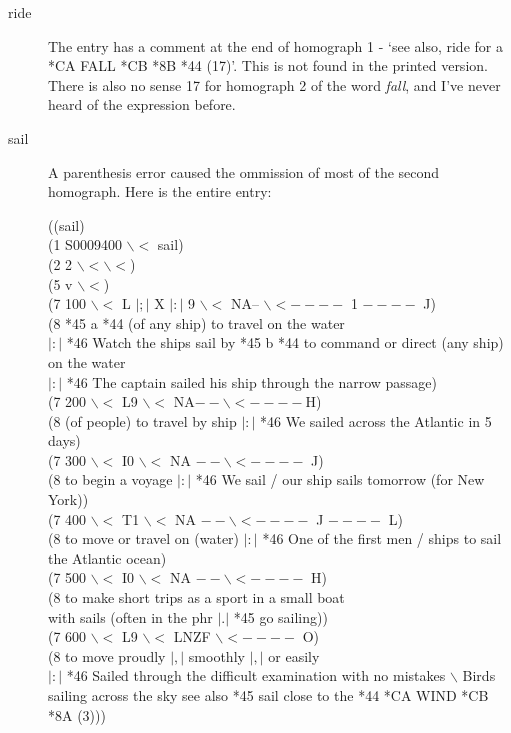 \begin{description}
\item [ride] The entry has a comment at the end of homograph 1 - `see also, 
ride for a *CA FALL *CB *8B *44 (17)'.  This is not found in the printed version.
There is also no sense 17 for homograph 2 of the word {\it fall}, and I've
never heard of the expression before.  


\item [sail] A parenthesis error caused the ommission of most of the second homograph.  Here
is the entire entry:

\indent ((sail)  \\
\indent (1 S0009400 $\backslash <$ sail)  \\
\indent (2 2 $\backslash < \backslash <$)  \\
\indent (5 v $\backslash <$) \\
\indent (7 100 $\backslash <$ L $|;|$ X $|:|$ 9 $\backslash <$ NA-- $\backslash < ----$ 1 $----$ J) \\
\indent (8 *45 a *44 (of any ship) to travel on the water  \\
\indent $|:|$ *46 Watch the ships sail by *45 b *44 to command or direct (any ship) on the water  \\
\indent $|:|$ *46 The captain sailed his ship through the narrow passage) \\
\indent (7 200 $\backslash <$ L9 $\backslash <$ NA$-- \backslash < ----$H)  \\
\indent (8 (of people) to travel by ship $|:|$ *46 We sailed across the Atlantic in 5 days) \\
\indent (7 300 $\backslash <$ I0 $\backslash <$ NA $-- \backslash < ----$ J)  \\
\indent (8 to begin a voyage $|:|$ *46 We sail / our ship sails tomorrow (for New York))  \\
\indent (7 400 $\backslash <$ T1 $\backslash <$ NA $-- \backslash < ----$ J $----$ L)  \\
\indent (8 to move or travel on (water) 
\indent $|:|$ *46 One of the first men / ships to sail the Atlantic ocean)  \\
\indent (7 500 $\backslash <$ I0 $\backslash <$ NA $-- \backslash < ----$ H)  \\
\indent (8 to make short trips as a sport in a small boat \\
\indent  with sails (often in the phr $|.|$ *45 go sailing))  \\
\indent (7 600 $\backslash <$ L9 $\backslash <$ LNZF $\backslash < ----$ O)  \\
\indent (8 to move proudly $|,|$ smoothly $|,|$ or easily  \\
\indent $|:|$ *46 Sailed through the difficult examination with no 
\indent mistakes $\backslash$    Birds sailing across the sky 
 see also *45 sail close to the *44 *CA WIND *CB *8A (3))) 



\end{description}
